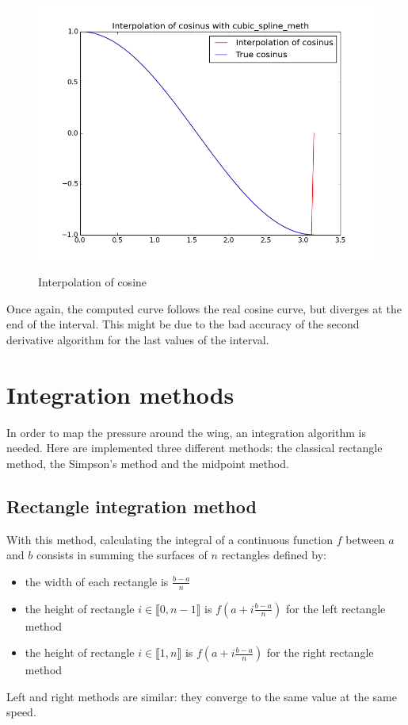 \documentclass{article}
\begin{document}
\begin{figure}[h]
  \centering
  \caption{Interpolation of cosine}
  \includegraphics[width=12cm]{cosinus_interpolation}
  \label{cosinus_interpolation}
\end{figure}

Once again, the computed curve follows the real cosine curve, but diverges at the end of the interval. This might be due to the bad accuracy of the second derivative algorithm for the last values of the interval.

\section{Integration methods}
In order to map the pressure around the wing, an integration algorithm is needed. Here are implemented three different methods: the classical rectangle method, the Simpson's method and the midpoint method.

\subsection{Rectangle integration method}
With this method, calculating the integral of a continuous function $f$ between $a$ and $b$ consists in summing the surfaces of $n$ rectangles defined by:
\begin{itemize}
\item the width of each rectangle is $\frac{b - a}{n}$
\item the height of rectangle $i \in \llbracket 0, n - 1 \rrbracket$ is $f(a + i\frac{b - a}{n})$ for the left rectangle method
\item the height of rectangle $i \in \llbracket 1, n \rrbracket$ is $f(a + i\frac{b - a}{n})$ for the right rectangle method
\end{itemize}
Left and right methods are similar: they converge to the same value at the same speed.
\end{document}
